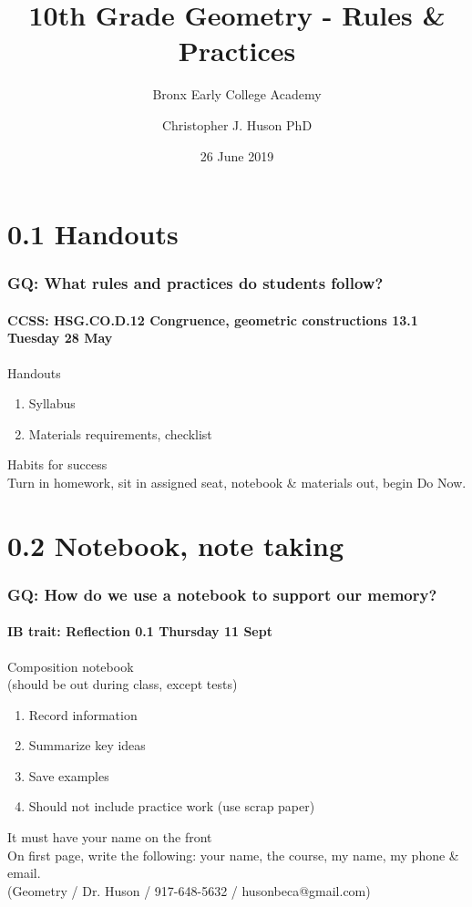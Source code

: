 \documentclass{beamer}
\title{10th Grade Geometry - Rules \& Practices}
\subtitle{Bronx Early College Academy}
\author{Christopher J. Huson PhD}
\date{26 June 2019}
\begin{document}
\frame{\titlepage}
\section[Outline]{}
\frame{\tableofcontents}


\section{0.1 Handouts}
  \frame
  {
    \frametitle{GQ: What rules and practices do students follow?}
    \framesubtitle{CCSS: HSG.CO.D.12 Congruence, geometric constructions \hfill \alert{13.1 Tuesday 28 May}}

    \begin{block}{Handouts}
      \begin{enumerate}
        \item Syllabus
        \item Materials requirements, checklist
      \end{enumerate}
    \end{block}
    Habits for success\\[0.25cm]
    Turn in homework, sit in assigned seat, notebook \& materials out, begin Do Now.
  }

\section{0.2 Notebook, note taking}
  \frame
  {
    \frametitle{GQ: How do we use a notebook to support our memory?}
    \framesubtitle{IB trait: Reflection \hfill \alert{0.1 Thursday 11 Sept}}

    \begin{block}{Composition notebook \\(should be out during class, except tests)}
      \begin{enumerate}
        \item Record information
        \item Summarize key ideas
        \item Save examples
        \item Should not include practice work (use scrap paper)
      \end{enumerate}
    \end{block}
    It must have your name on the front\\[0.25cm]
    On first page, write the following: your name, the course, my name, my phone \& email. \\(Geometry / Dr. Huson / 917-648-5632 / husonbeca@gmail.com)
  }
\end{document}

